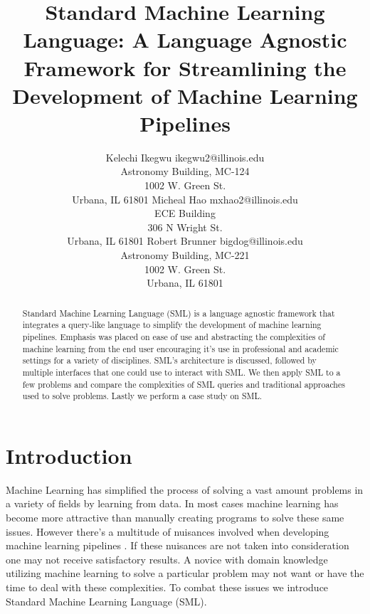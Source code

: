 \documentclass[jair,twoside,11pt,theapa]{article}
\begin{document}
\title{Standard Machine Learning Language: A Language Agnostic Framework for Streamlining the Development of Machine Learning Pipelines}

\author{\name Kelechi Ikegwu \email ikegwu2@illinois.edu \\
        Astronomy Building, MC-124 \\1002 W. Green St.\\ Urbana, IL  61801
       \AND
       \name Micheal Hao  \email mxhao2@illinois.edu \\
       \addr ECE Building \\306 N Wright St. \\ Urbana, IL 61801
       \AND
       \name Robert Brunner \email bigdog@illinois.edu\\
        Astronomy Building, MC-221 \\1002 W. Green St.\\ Urbana, IL  61801}


\maketitle


\begin{abstract}
Standard Machine Learning Language (SML) is a language agnostic framework that integrates a query-like language to simplify the development of machine learning pipelines. Emphasis was placed on ease of use and abstracting the complexities of machine learning from the end user encouraging it's use in professional and academic settings for a variety of disciplines. SML's architecture is discussed, followed by multiple interfaces that one could use to interact with SML. We then apply SML to a few problems and compare the complexities of SML queries and traditional approaches used to solve problems. Lastly we perform a case study on SML.
\end{abstract}

\section{Introduction}
\label{Introduction}

Machine Learning has simplified the process of solving a vast amount problems in a variety of fields by learning from data. In most cases machine learning has become more attractive than manually creating programs to solve these same issues. However there's a multitude of nuisances involved when developing machine learning pipelines \cite{pedros:fewUsefulThings}. If these nuisances are not taken into consideration one may not receive satisfactory results. A novice with domain knowledge utilizing machine learning to solve a particular problem may not want or have the time to deal with these complexities. To combat these issues we introduce Standard Machine Learning Language (SML).
\end{document}
